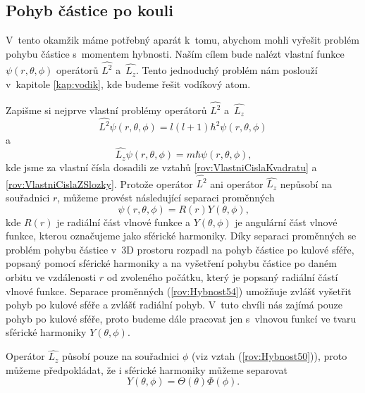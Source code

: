 \subsection{Pohyb částice po kouli}
\label{kap:PohybCasticePoKouli}

V~tento okamžik máme potřebný aparát k~tomu, abychom mohli vyřešit problém pohybu částice s~momentem hybnosti. Naším cílem bude nalézt vlastní funkce $\psi(r, \theta, \phi)$ operátorů $\hat{L^2}$ a~$\hat{L_z}$. Tento jednoduchý problém nám poslouží  v~kapitole \ref{kap:vodik}, kde budeme řešit vodíkový atom.

Zapišme si nejprve vlastní problémy operátorů $\hat{L^2}$ a~$\hat{L_z}$
\begin{equation}
\hat{L^2}\psi(r, \theta, \phi) = l(l+1) \hbar^2 \psi(r, \theta, \phi)
\label{rov:Hybnost52}
\end{equation}
a
\begin{equation}
\hat{L_z}\psi(r, \theta, \phi) = m \hbar \psi(r, \theta, \phi) \mbox{,}
\label{rov:Hybnost53}
\end{equation}
kde jsme za vlastní čísla dosadili ze vztahů \eqref{rov:VlastniCislaKvadratu} a \eqref{rov:VlastniCislaZSlozky}. Protože operátor $\hat{L^2}$ ani operátor $\hat{L_z}$ nepůsobí na souřadnici $r$, můžeme provést následující separaci proměnných
\begin{equation}
\psi(r, \theta, \phi) = R(r)Y(\theta, \phi) \mbox{,}
\label{rov:Hybnost54}
\end{equation} 
kde $R(r)$ je radiální část vlnové funkce a $Y(\theta, \phi)$ je angulární část vlnové funkce, kterou označujeme jako sférické harmoniky. Díky separaci proměnných se problém pohybu částice v~3D prostoru rozpadl na pohyb částice po kulové sféře, popsaný pomocí sférické harmoniky a na vyšetření pohybu částice po daném orbitu ve vzdálenosti $r$ od zvoleného počátku, který je popsaný radiální částí vlnové funkce. Separace proměnných (\ref{rov:Hybnost54}) umožňuje zvlášť vyšetřit pohyb po kulové sféře a zvlášť radiální pohyb. V~tuto chvíli nás zajímá pouze pohyb po kulové sféře, proto budeme dále pracovat jen s~vlnovou funkcí ve tvaru sférické harmoniky $Y(\theta, \phi)$.

Operátor $\hat{L_z}$ působí pouze na souřadnici $\phi$ (viz vztah (\ref{rov:Hybnost50})), proto můžeme předpokládat, že i sférické harmoniky můžeme separovat
\begin{equation}
Y(\theta, \phi) = \Theta (\theta) \Phi (\phi) \mbox{.}
\label{rov:Hybnost55}
\end{equation}

